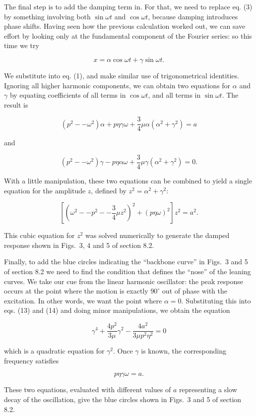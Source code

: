   The final step is to add the damping term in. For that, we need to replace 
  eq. (3) by something involving both $\sin \omega t$ and $\cos \omega t$, 
  because damping introduces phase shifts. Having seen how the previous 
  calculation worked out, we can save effort by looking only at the fundamental 
  component of the Fourier series: so this time we try 

  $$x=\alpha \cos \omega t + \gamma \sin \omega t . \tag{12}$$ 

  We substitute into eq. (1), and make similar use of trigonometrical 
  identities. Ignoring all higher harmonic components, we can obtain two 
  equations for $\alpha$ and $\gamma$ by equating coefficients of all terms in 
  $\cos \omega t$, and all terms in $\sin \omega t$. The result is 

  $$(p^2 -- \omega^2) \alpha +p \eta \gamma \omega +\frac{3}{4} \mu \alpha 
  (\alpha^2 + \gamma^2) = a \tag{13}$$ 

  and 

  $$(p^2 -- \omega^2) \gamma -p \eta \alpha \omega +\frac{3}{4} \mu \gamma 
  (\alpha^2 + \gamma^2) = 0 . \tag{14}$$ 

  With a little manipulation, these two equations can be combined to yield a 
  single equation for the amplitude $z$, defined by $z^2=\alpha^2 + \gamma^2$: 

  $$\left[ \left(\omega^2 -- p^2 -- \frac{3}{4} \mu z^2 \right)^2 + (p \eta 
  \omega)^2 \right] z^2 = a^2. \tag{15}$$ 

  This cubic equation for $z^2$ was solved numerically to generate the damped 
  response shown in Figs.\ 3, 4 and 5 of section 8.2. 

  Finally, to add the blue circles indicating the ``backbone curve'' in Figs.\ 
  3 and 5 of section 8.2 we need to find the condition that defines the 
  ``nose'' of the leaning curves. We take our cue from the linear harmonic 
  oscillator: the peak response occurs at the point where the motion is exactly 
  $90^\circ$ out of phase with the excitation. In other words, we want the 
  point where $\alpha = 0$. Substituting this into eqs. (13) and (14) and doing 
  minor manipulations, we obtain the equation 

  $$\gamma^4 +\dfrac{4p^2}{3 \mu} \gamma^2 -\dfrac{4a^2}{3 \mu p^2 \eta^2}=0 
  \tag{16}$$ 

  which is a quadratic equation for $\gamma^2$. Once $\gamma$ is known, the 
  corresponding frequency satisfies 

  $$p \eta \gamma \omega = a. \tag{17}$$ 

  These two equations, evaluated with different values of $a$ representing a 
  slow decay of the oscillation, give the blue circles shown in Figs.\ 3 and 5 
  of section 8.2. 
